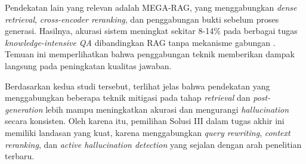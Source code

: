 Pendekatan lain yang relevan adalah MEGA-RAG, yang menggabungkan \textit{dense retrieval}, \textit{cross-encoder reranking}, dan penggabungan bukti sebelum proses generasi. Hasilnya, akurasi sistem meningkat sekitar 8-14\% pada berbagai tugas \textit{knowledge-intensive QA} dibandingkan RAG tanpa mekanisme gabungan \parencite{li2023megarag}. Temuan ini memperlihatkan bahwa penggabungan teknik memberikan dampak langsung pada peningkatan kualitas jawaban.

Berdasarkan kedua studi tersebut, terlihat jelas bahwa pendekatan yang menggabungkan beberapa teknik mitigasi pada tahap \textit{retrieval} dan \textit{post-generation} lebih mampu meningkatkan akurasi dan mengurangi \textit{hallucination} secara konsisten. Oleh karena itu, pemilihan Solusi III dalam tugas akhir ini memiliki landasan yang kuat, karena menggabungkan \textit{query rewriting}, \textit{context reranking}, dan \textit{active hallucination detection} yang sejalan dengan arah penelitian terbaru.

